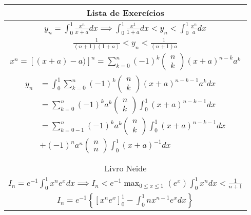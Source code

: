 \documentclass{article}
\begin{document}
\begin{tabular}{c}
Lista de Exercícios\\
\midrule
$ y_n = \int_0^1 \frac{x^n}{x+a} dx \implies \int_0^1 \frac{x^1}{1+a}dx < y_n < \int_0^1 \frac{x^n}{a}dx$\\
$ \frac{1}{(n+1)(1+a)} < y_n < \frac{1}{(n+1)a}$\\
$ x^n = [(x+a)-a)]^n = \displaystyle\sum_{k=0}^{n} (-1)^k \left( \begin{array}{c}
n\\
k
\end{array}
\right) (x+a)^{n-k}a^k$\\

$
\begin{aligned}
 y_n &= \displaystyle \int_0^1 \displaystyle \sum_{k=0}^{n} (-1)^k \left( \begin{array}{c}
n\\
k
\end{array}
\right) (x+a)^{n-k-1}a^k dx\\

&= \displaystyle \sum_{k=0}^{n} (-1)^k a^k \left( \begin{array}{c}
n\\
k
\end{array}
\right) \displaystyle \int_0^1 (x+a)^{n-k-1} dx\\

&= \displaystyle \sum_{k=0-1}^{n} (-1)^k a^k \left( \begin{array}{c}
n\\
k
\end{array}
\right) \displaystyle \int_0^1 (x+a)^{n-k-1} dx\\

&+ (-1)^n a^n \left( \begin{array}{c}
n\\
n
\end{array}
\right) \displaystyle \int_0^1 (x+a)^{-1}dx\\
\end{aligned}
$\\
\hline
Livro Neide\\
\hline
$ I_n = e^{-1} \displaystyle \int_0^1 x^n e^x dx \implies I_n < e^{-1} \max_{0\leq x \leq 1}(e^x) \displaystyle \int_0^1 x^n dx < \frac{1}{n+1} $\\
$ I_n = e^{-1} \left\{ \displaystyle \left[x^n e^x \right]_0^1 - \displaystyle \int_0^1 n x^{n-1} e^x dx \right\} $\\
\hline
\end{tabular}
\end{document}
